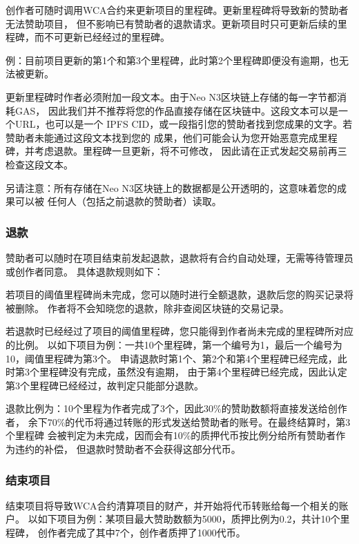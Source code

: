 \documentclass[11pt,UTF8,a4paper]{ctexart}
\begin{document}
    创作者可随时调用WCA合约来更新项目的里程碑。更新里程碑将导致新的赞助者无法赞助项目，
    但不影响已有赞助者的退款请求。更新项目时只可更新后续的里程碑，而不可更新已经经过的里程碑。

    例：目前项目更新的第1个和第3个里程碑，此时第2个里程碑即便没有逾期，也无法被更新。

    更新里程碑时作者必须附加一段文本。由于Neo N3区块链上存储的每一字节都消耗GAS，
    因此我们并不推荐将您的作品直接存储在区块链中。这段文本可以是一个URL，也可以是一个
    IPFS CID，或一段指引您的赞助者找到您成果的文字。若赞助者未能通过这段文本找到您的
    成果，他们可能会认为您开始恶意完成里程碑，并考虑退款。里程碑一旦更新，将不可修改，
    因此请在正式发起交易前再三检查这段文本。

    另请注意：所有存储在Neo N3区块链上的数据都是公开透明的，这意味着您的成果可以被
    任何人（包括之前退款的赞助者）读取。

    \subsubsection{退款}

    赞助者可以随时在项目结束前发起退款，退款将有合约自动处理，无需等待管理员或创作者同意。
    具体退款规则如下：

    若项目的阈值里程碑尚未完成，您可以随时进行全额退款，退款后您的购买记录将被删除。
    作者将不会知晓您的退款，除非查阅区块链的交易记录。

    若退款时已经经过了项目的阈值里程碑，您只能得到作者尚未完成的里程碑所对应的比例。
    以如下项目为例：一共10个里程碑，第一个编号为1，最后一个编号为10，阈值里程碑为第3个。
    申请退款时第1个、第2个和第4个里程碑已经完成，此时第3个里程碑没有完成，虽然没有逾期，
    由于第4个里程碑已经完成，因此认定第3个里程碑已经经过，故判定只能部分退款。

    退款比例为：10个里程为作者完成了3个，因此30\%的赞助数额将直接发送给创作者，
    余下70\%的代币将通过转账的形式发送给赞助者的账号。在最终结算时，第3个里程碑
    会被判定为未完成，因而会有10\%的质押代币按比例分给所有赞助者作为违约的补偿，
    但退款时赞助者不会获得这部分代币。

    \subsubsection{结束项目}

    结束项目将导致WCA合约清算项目的财产，并开始将代币转账给每一个相关的账户。
    以如下项目为例：某项目最大赞助数额为5000，质押比例为0.2，共计10个里程碑，
    创作者完成了其中7个，创作者质押了1000代币。
\end{document}
